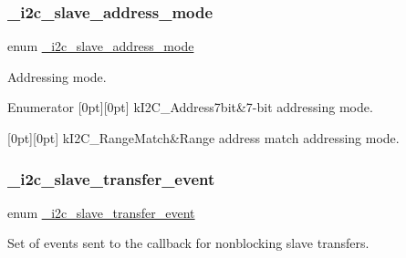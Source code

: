 \subsubsection{\texorpdfstring{\_i2c\_slave\_address\_mode}{\_i2c\_slave\_address\_mode}}
{\footnotesize\ttfamily enum \mbox{\hyperlink{group__i2c__driver_gae1e1e45d8491652a249bf48530911ac7}{\+\_\+i2c\+\_\+slave\+\_\+address\+\_\+mode}}}



Addressing mode. 

\begin{DoxyEnumFields}{Enumerator}
[0pt][0pt]{}\mbox{\label{group__i2c__driver_ggae1e1e45d8491652a249bf48530911ac7a3e2c7f1f917939d0d7595224e3700dd4}} 
k\+I2\+C\+\_\+\+Address7bit&7-\/bit addressing mode. \\
\hline

[0pt][0pt]{}\mbox{\label{group__i2c__driver_ggae1e1e45d8491652a249bf48530911ac7aa2c312f87691c542c466ff747d21f70a}} 
k\+I2\+C\+\_\+\+Range\+Match&Range address match addressing mode. \\
\hline

\end{DoxyEnumFields}
\mbox{\label{group__i2c__driver_ga87e42e170b60f17f657ef3c06a918133}} 
\subsubsection{\texorpdfstring{\_i2c\_slave\_transfer\_event}{\_i2c\_slave\_transfer\_event}}
{\footnotesize\ttfamily enum \mbox{\hyperlink{group__i2c__driver_ga87e42e170b60f17f657ef3c06a918133}{\+\_\+i2c\+\_\+slave\+\_\+transfer\+\_\+event}}}



Set of events sent to the callback for nonblocking slave transfers. 

